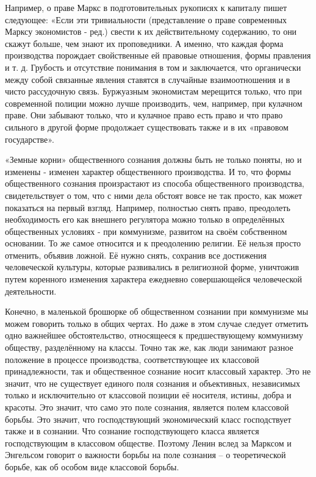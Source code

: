 \documentclass[../main]{subfiles}
\begin{document}
Например, о праве Маркс в подготовительных рукописях к капиталу пишет следующее: «Если эти тривиальности (представление о праве современных Марксу экономистов - ред.) свести к их действительному содержанию, то они скажут больше, чем знают их проповедники. А именно, что каждая форма производства порождает свойственные ей правовые отношения, формы правления и т. д. Грубость и отсутствие понимания в том и заключается, что органически между собой связанные явления ставятся в случайные взаимоотношения и в чисто рассудочную связь. Буржуазным экономистам мерещится только, что при современной полиции можно лучше производить, чем, например, при кулачном праве. Они забывают только, что и кулачное право есть право и что право сильного в другой форме продолжает существовать также и в их «правовом государстве».

«Земные корни» общественного сознания должны быть не только поняты, но и изменены - изменен характер общественного производства. И то, что формы общественного сознания произрастают из способа общественного производства, свидетельствует о том, что с ними дела обстоят вовсе не так просто, как может показаться на первый взгляд. Например, полностью снять право, преодолеть необходимость его как внешнего регулятора можно только в определённых общественных условиях - при коммунизме, развитом на своём собственном основании. То же самое относится и к преодолению религии. Её нельзя просто отменить, объявив ложной. Её нужно снять, сохранив все достижения человеческой культуры, которые развивались в религиозной форме, уничтожив путем коренного изменения характера ежедневно совершающейся человеческой деятельности.

Конечно, в маленькой брошюрке об общественном сознании при коммунизме мы можем говорить только в общих чертах. Но даже в этом случае следует отметить одно важнейшее обстоятельство, относящееся к предшествующему коммунизму обществу, разделённому на классы. Точно так же, как люди занимают разное положение в процессе производства, соответствующее их классовой принадлежности, так и общественное сознание носит классовый характер. Это не значит, что не существует единого поля сознания и объективных, независимых только и исключительно от классовой позиции её носителя, истины, добра и красоты. Это значит, что само это поле сознания, является полем классовой борьбы. Это значит, что господствующий экономический класс господствует также и в сознании. Что сознание господствующего класса является господствующим в классовом обществе. Поэтому Ленин вслед за Марксом и Энгельсом говорит о важности борьбы на поле сознания – о теоретической борьбе, как об особом виде классовой борьбы.
\end{document}
